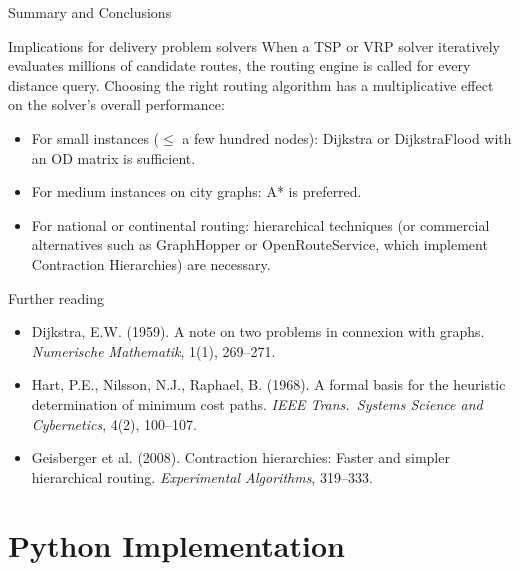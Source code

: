 \documentclass[aspectratio=169,10pt]{beamer}
\begin{document}
\begin{frame}[allowframebreaks]{Summary and Conclusions}
  \framebreak

  \begin{alertblock}{Implications for delivery problem solvers}
    When a TSP or VRP solver iteratively evaluates millions of candidate
    routes, the routing engine is called for every distance query.
    Choosing the right routing algorithm has a multiplicative effect on
    the solver's overall performance:
    \begin{itemize}
      \item For small instances ($\leq$ a few hundred nodes): Dijkstra
        or DijkstraFlood with an OD matrix is sufficient.
      \item For medium instances on city graphs: A* is preferred.
      \item For national or continental routing: hierarchical techniques
        (or commercial alternatives such as GraphHopper or OpenRouteService,
        which implement Contraction Hierarchies) are necessary.
    \end{itemize}
  \end{alertblock}

  \begin{block}{Further reading}
    \begin{itemize}
      \item Dijkstra, E.W. (1959). A note on two problems in connexion
        with graphs. \textit{Numerische Mathematik}, 1(1), 269--271.
      \item Hart, P.E., Nilsson, N.J., Raphael, B. (1968). A formal
        basis for the heuristic determination of minimum cost paths.
        \textit{IEEE Trans.\ Systems Science and Cybernetics}, 4(2),
        100--107.
      \item Geisberger et al. (2008). Contraction hierarchies: Faster and
        simpler hierarchical routing. \textit{Experimental Algorithms},
        319--333.
    \end{itemize}
  \end{block}
\end{frame}

\section{Python Implementation}
\end{document}
